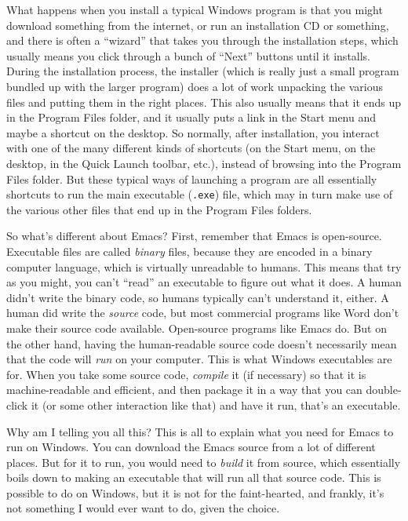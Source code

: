 \documentclass{article}
\begin{document}
What happens when you install a typical Windows program is that you might download something from the internet, or run an installation CD or something, and there is often a ``wizard'' that takes you through the installation steps, which usually means you click through a bunch of ``Next'' buttons until it installs. During the installation process, the installer (which is really just a small program bundled up with the larger program) does a lot of work unpacking the various files and putting them in the right places. This also usually means that it ends up in the Program Files folder, and it usually puts a link in the Start menu and maybe a shortcut on the desktop. So normally, after installation, you interact with one of the many different kinds of shortcuts (on the Start menu, on the desktop, in the Quick Launch toolbar, etc.), instead of browsing into the Program Files folder.  But these typical ways of launching a program are all essentially shortcuts to run the main executable (\texttt{.exe}) file, which may in turn make use of the various other files that end up in the Program Files folders.

So what's different about Emacs?  First, remember that Emacs is open-source. Executable files are called \emph{binary} files, because they are encoded in a binary computer language, which is virtually unreadable to humans. This means that try as you might, you can't ``read'' an executable to figure out what it does.  A human didn't write the binary code, so humans typically can't understand it, either. A human did write the \emph{source} code, but most commercial programs like Word don't make their source code available. Open-source programs like Emacs do. But on the other hand, having the human-readable source code doesn't necessarily mean that the code will \emph{run} on your computer.  This is what Windows executables are for.  When you take some source code, \emph{compile} it (if necessary) so that it is machine-readable and efficient, and then package it in a way that you can double-click it (or some other interaction like that) and have it run, that's an executable.

Why am I telling you all this? This is all to explain what you need for Emacs to run on Windows. You can download the Emacs source from a lot of different places. But for it to run, you would need to \emph{build} it from source, which essentially boils down to making an executable that will run all that source code.  This is possible to do on Windows, but it is not for the faint-hearted, and frankly, it's not something I would ever want to do, given the choice.
\end{document}
